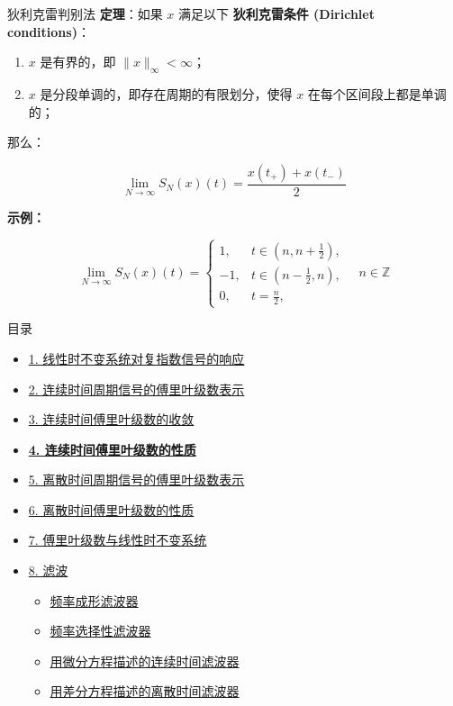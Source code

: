 \documentclass[
  ignorenonframetext,
]{beamer}
\providecommand{\tightlist}{%
  \setlength{\itemsep}{0pt}\setlength{\parskip}{0pt}}
\begin{document}
\begin{frame}{狄利克雷判别法}
\protect{}\label{ux72c4ux5229ux514bux96f7ux5224ux522bux6cd5}
\textbf{定理}：如果 \(x\) 满足以下 \textbf{狄利克雷条件 (Dirichlet
conditions)}：

\begin{enumerate}
\tightlist
\item
  \(x\) 是有界的，即 \(\|x\|_\infty < \infty\)；
\item
  \(x\) 是分段单调的，即存在周期的有限划分，使得 \(x\)
  在每个区间段上都是单调的；
\end{enumerate}

那么：

\[\lim_{N \to \infty} S_N(x)(t) = \frac{x(t_+) + x(t_-)}{2}\]

\textbf{示例：}

\[\lim_{N \to \infty} S_N(x)(t) = \begin{cases} 1, & t \in (n, n + \frac{1}{2}), \\ -1, & t \in (n - \frac{1}{2}, n), \\ 0, & t = \frac{n}{2}, \end{cases} \quad n \in \mathbb{Z}\]
\end{frame}

\begin{frame}{目录}
\protect{}\label{toc3}
\begin{itemize}
\tightlist
\item
  \hyperlink{sec31}{1. 线性时不变系统对复指数信号的响应}
\item
  \hyperlink{sec32}{2. 连续时间周期信号的傅里叶级数表示}
\item
  \hyperlink{sec33}{3. 连续时间傅里叶级数的收敛}
\item
  \hyperlink{sec34}{\textbf{4. 连续时间傅里叶级数的性质}}
\item
  \hyperlink{35}{5. 离散时间周期信号的傅里叶级数表示}
\item
  \hyperlink{sec36}{6. 离散时间傅里叶级数的性质}
\item
  \hyperlink{sec37}{7. 傅里叶级数与线性时不变系统}
\item
  \hyperlink{sec38}{8. 滤波}

  \begin{itemize}
  \tightlist
  \item
    \hyperlink{sec381}{频率成形滤波器}
  \item
    \hyperlink{sec382}{频率选择性滤波器}
  \item
    \hyperlink{sec383}{用微分方程描述的连续时间滤波器}
  \item
    \hyperlink{sec383}{用差分方程描述的离散时间滤波器}
  \end{itemize}
\end{itemize}
\end{frame}
\end{document}
